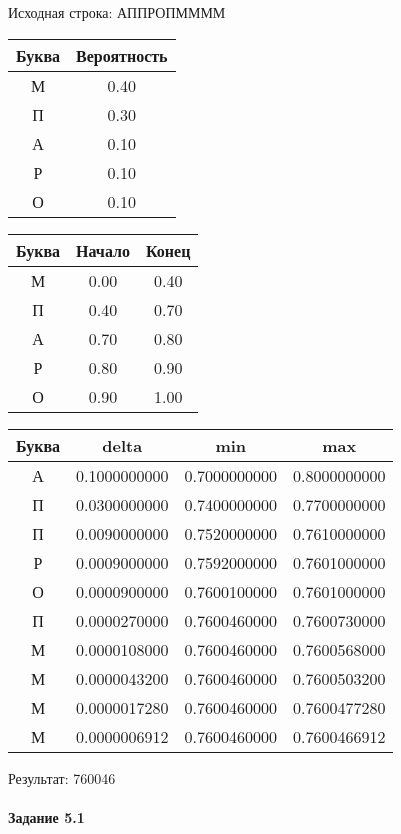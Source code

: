 \documentclass[a4paper, 12pt]{article}
\begin{document}
Исходная строка: АППРОПММММ\
\begin{center}
 \begin{tabular}{ |c|c| } 
  \hline
     Буква & Вероятность \\ \hline
М & 0.40\\\hline
П & 0.30\\\hline
А & 0.10\\\hline
Р & 0.10\\\hline
О & 0.10
\\ \hline \end{tabular}
\end{center}
\begin{center}
 \begin{tabular}{ |c|c|c| } 
  \hline
     Буква & Начало & Конец \\ \hline
М & 0.00 & 0.40\\\hline
П & 0.40 & 0.70\\\hline
А & 0.70 & 0.80\\\hline
Р & 0.80 & 0.90\\\hline
О & 0.90 & 1.00
\\ \hline \end{tabular}
\end{center}
\begin{center}
 \begin{tabular}{ |c|c|c|c| } 
  \hline
     Буква & delta & min & max \\ \hline
А & 0.1000000000 & 0.7000000000 & 0.8000000000\\\hline
П & 0.0300000000 & 0.7400000000 & 0.7700000000\\\hline
П & 0.0090000000 & 0.7520000000 & 0.7610000000\\\hline
Р & 0.0009000000 & 0.7592000000 & 0.7601000000\\\hline
О & 0.0000900000 & 0.7600100000 & 0.7601000000\\\hline
П & 0.0000270000 & 0.7600460000 & 0.7600730000\\\hline
М & 0.0000108000 & 0.7600460000 & 0.7600568000\\\hline
М & 0.0000043200 & 0.7600460000 & 0.7600503200\\\hline
М & 0.0000017280 & 0.7600460000 & 0.7600477280\\\hline
М & 0.0000006912 & 0.7600460000 & 0.7600466912
\\ \hline \end{tabular}
\end{center}
Результат: 760046
\pagebreak
\paragraph{Задание 5.1 \\
}
\end{document}
